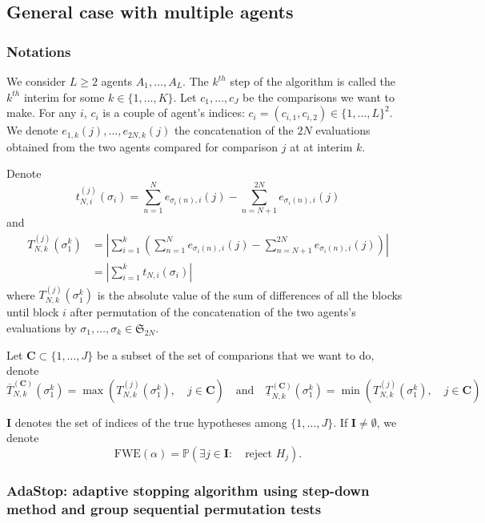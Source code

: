 \documentclass{article}
\theoremstyle{plain}
\theoremstyle{remark}
\renewcommand{\P}{\mathbb{P}}
\renewcommand{\S}{\mathfrak{S}}
\newcommand{\1}{\mathbbm{1}}
\numberwithin{equation}{section}
\begin{document}
\subsection{General case with multiple agents}\label{sec:multi}

\subsubsection{Notations}
 We consider $L\ge 2$ agents $A_1,\dots,A_L$. The $k^{th}$ step of the algorithm is called the $k^{th}$ interim for some $k \in \{1,\dots,K\}$. Let $c_1,\dots,c_J$ be the comparisons we want to make. For any $i$, $c_i$ is a couple of agent's indices: $c_i=(c_{i,1},c_{i,2}) \in \{1,\dots,L\}^2$. We denote $e_{1,k}(j), \dots, e_{2N, k}(j)$ the concatenation of the $2N$ evaluations obtained from the two agents compared for comparison $j$ at at interim $k$.

Denote 
$$t_{N,i}^{(j)}(\sigma_i) =  \sum_{n=1}^{N} e_{\sigma_i(n),i}(j)-\sum_{n=N+1}^{2N} e_{\sigma_i(n),i}(j)$$
and 
\begin{align*}
T_{N,k}^{(j)}(\sigma_1^k)&= \left|\sum_{i=1}^k\left(\sum_{n=1}^{N} e_{\sigma_i(n),i}(j)-\sum_{n=N+1}^{2N} e_{\sigma_i(n),i}(j)\right)\right|  \\
&=  \left|\sum_{i=1}^kt_{N,i}(\sigma_i)\right|
\end{align*}
where 
$T_{N,k}^{(j)}(\sigma_1^k)$ is the absolute value of the sum of differences of all the blocks until block $i$ after permutation of the concatenation of the two agents's evaluations by $\sigma_1,\dots,\sigma_k\in \S_{2N}$.

Let $\textbf{C} \subset \{1,\dots,J\}$ be a subset of the set of comparions that we want to do, denote
$$\overline{T}_{N,k}^{(\textbf{C})}(\sigma_1^k)= \max\left(T_{N,k}^{(j)}(\sigma_1^k),\quad j \in \textbf{C}\right) \quad \text{and}\quad \underline{T}_{N,k}^{(\textbf{C})}(\sigma_1^k)= \min\left(T_{N,k}^{(j)}(\sigma_1^k),\quad j \in \textbf{C}\right)$$
 
$\textbf{I}$ denotes the set of indices of the true hypotheses among $\{1,\dots,J\}$. If $\textbf{I} \neq \emptyset$, we denote 
$$\mathrm{FWE}(\alpha) = \P\left(\exists j \in \textbf{I}:\quad  \text{reject }H_j \right).$$
\subsubsection{AdaStop: adaptive stopping algorithm using step-down method and group sequential permutation tests}\label{sec:main_algo}
\end{document}
